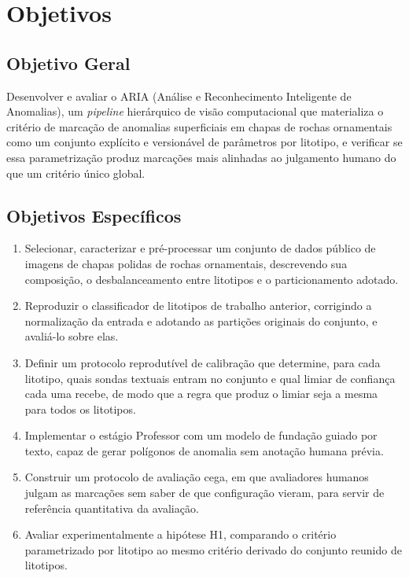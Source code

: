 \section{Objetivos}

\subsection{Objetivo Geral}

Desenvolver e avaliar o ARIA (Análise e Reconhecimento Inteligente de Anomalias), um \textit{pipeline} hierárquico de visão computacional que materializa o critério de marcação de anomalias superficiais em chapas de rochas ornamentais como um conjunto explícito e versionável de parâmetros por litotipo, e verificar se essa parametrização produz marcações mais alinhadas ao julgamento humano do que um critério único global.

\subsection{Objetivos Específicos}
\label{sec:objetivos}

\begin{enumerate}
  \item Selecionar, caracterizar e pré-processar um conjunto de dados público de imagens de chapas polidas de rochas ornamentais, descrevendo sua composição, o desbalanceamento entre litotipos e o particionamento adotado.
  \item Reproduzir o classificador de litotipos de trabalho anterior, corrigindo a normalização da entrada e adotando as partições originais do conjunto, e avaliá-lo sobre elas.
  \item Definir um protocolo reprodutível de calibração que determine, para cada litotipo, quais sondas textuais entram no conjunto e qual limiar de confiança cada uma recebe, de modo que a regra que produz o limiar seja a mesma para todos os litotipos.
  \item Implementar o estágio Professor com um modelo de fundação guiado por texto, capaz de gerar polígonos de anomalia sem anotação humana prévia.
  \item Construir um protocolo de avaliação cega, em que avaliadores humanos julgam as marcações sem saber de que configuração vieram, para servir de referência quantitativa da avaliação.
  \item Avaliar experimentalmente a hipótese H1, comparando o critério parametrizado por litotipo ao mesmo critério derivado do conjunto reunido de litotipos.
\end{enumerate}

